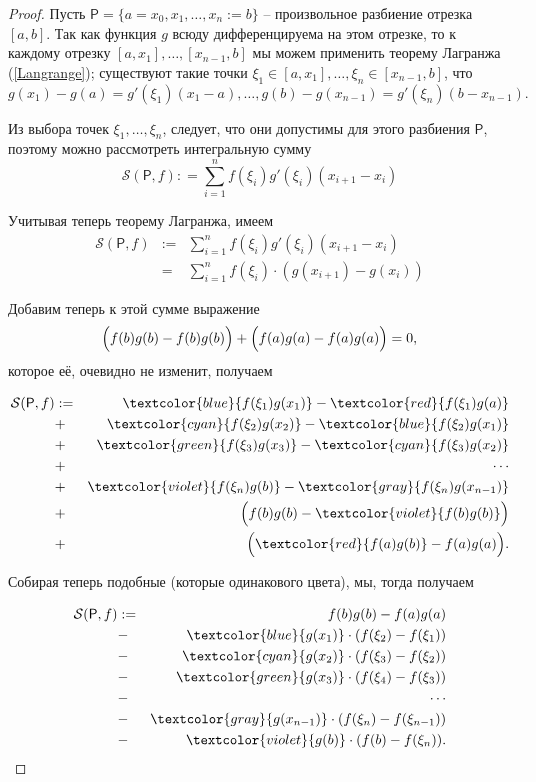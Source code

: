 \begin{proof}
 Пусть $\mathsf{P} = \{a=x_0, x_1,\ldots, x_n:=b\}$ -- произвольное разбиение отрезка $[a,b]$. Так как функция $g$ всюду дифференцируема на этом отрезке, то к каждому отрезку $[a,x_1], \ldots, [x_{n-1},b]$ мы можем применить теорему Лагранжа (\ref{Langrange}); существуют такие точки $\xi_1 \in [a,x_1], \ldots, \xi_n \in [x_{n-1},b]$, что
  \[
   g(x_1) - g(a) = g'(\xi_1)(x_1 - a), \ldots, g(b)-g(x_{n-1}) = g'(\xi_n)(b-x_{n-1}).
 \]

 Из выбора точек $\xi_1,\ldots, \xi_n$, следует, что они допустимы для этого разбиения $\mathsf{P}$, поэтому можно рассмотреть интегральную сумму 
 \[
  \mathcal{S}(\mathsf{P},f): = \sum_{i=1}^{n} f(\xi_i)g'(\xi_i)(x_{i+1}-x_i)
 \]

Учитывая теперь теорему Лагранжа, имеем
\begin{eqnarray*}
 \mathcal{S}(\mathsf{P},f) &:=& \sum_{i=1}^{n} f(\xi_i)g'(\xi_i)(x_{i+1}-x_i) \\
 &=& \sum_{i=1}^{n} f(\xi_i) \cdot \left( g(x_{i+1}) - g(x_i)  \right)
\end{eqnarray*}

Добавим теперь к этой сумме выражение 
\[
\Bigl(  f(b)g(b) - f(b) g(b) \Bigr) + \Bigl( f(a)g(a)- f(a)g(a) \Bigr) =0 ,
\]
которое её, очевидно не изменит, получаем

\begin{eqnarray*}
     \mathcal{S}(\mathsf{P},f) &:=& \textcolor{blue}{f(\xi_1) g(x_1)} - \textcolor{red}{f(\xi_1) g(a)} \\
     & +& \textcolor{cyan}{f(\xi_2)g(x_2)} - \textcolor{blue}{f(\xi_2)g(x_1)} \\
     & +& \textcolor{green}{f(\xi_3)g(x_3)} - \textcolor{cyan}{f(\xi_3)g(x_2)}\\
     &+& \cdots \\
     & +& \textcolor{violet}{f(\xi_n)g(b)} - \textcolor{gray}{f(\xi_n)g(x_{n-1})}\\
     & +& \Bigl({f(b)g(b)} - \textcolor{violet}{f(b)g(b)} \Bigr) \\
     & +& \Bigl(\textcolor{red}{f(a)g(b)} - {f(a)g(a)}\Bigr).
\end{eqnarray*}

Собирая теперь подобные (которые одинакового цвета), мы, тогда получаем

\begin{eqnarray*}
    \mathcal{S}(\mathsf{P},f) &:=& f(b)g(b) - f(a)g(a) \\
    &-& \textcolor{blue}{g(x_1)} \cdot (f(\xi_2) - f(\xi_1)) \\
    &-& \textcolor{cyan}{g(x_2)} \cdot (f(\xi_3) - f(\xi_2)) \\
    &-& \textcolor{green}{g(x_3)} \cdot (f(\xi_4) - f(\xi_3)) \\
    &-& \cdots \\
    &-& \textcolor{gray}{g(x_{n-1})} \cdot (f(\xi_n) - f(\xi_{n-1})) \\
    &-& \textcolor{violet}{g(b)} \cdot (f(b) - f(\xi_n)). \\
\end{eqnarray*}


\end{proof}
